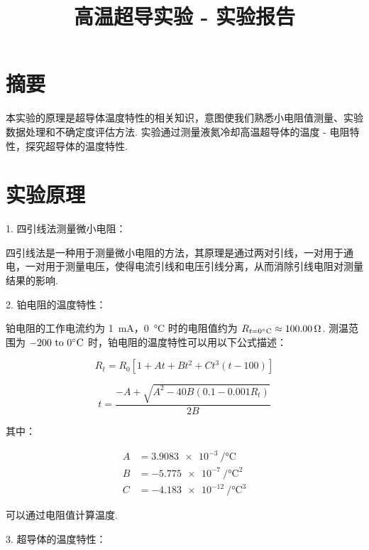 \documentclass{THUexprep}
\begin{document}
\title{高温超导实验 - 实验报告}
\maketitle

\section{摘要}

本实验的原理是超导体温度特性的相关知识，意图使我们熟悉小电阻值测量、实验数据处理和不确定度评估方法. 实验通过测量液氮冷却高温超导体的温度 - 电阻特性，探究超导体的温度特性.

\section{实验原理}

1. 四引线法测量微小电阻：

四引线法是一种用于测量微小电阻的方法，其原理是通过两对引线，一对用于通电，一对用于测量电压，使得电流引线和电压引线分离，从而消除引线电阻对测量结果的影响.

2. 铂电阻的温度特性：

铂电阻的工作电流约为 \SI{1}{\milli\ampere}，\SI{0}{\celsius} 时的电阻值约为 $R_{t=0\celsius}\approx\SI{100.00}{\ohm}$. 测温范围为 $\numrange{-200}{0}\celsius$ 时，铂电阻的温度特性可以用以下公式描述：

\begin{equation}
    R_t = R_0 \left[1 + A t + B t^2 + C t^3(t-100)\right]
\end{equation}

\begin{equation}
    t=\frac{-A+\sqrt{A^2-40B(0.1-0.001R_t)}}{2B}
\end{equation}

其中：

\begin{equation}
    \begin{aligned}
        A &= \SI{3.9083e-3}{\per\celsius}\\
        B &= \SI{-5.775e-7}{\per\celsius\squared}\\
        C &= \SI{-4.183e-12}{\per\celsius\cubed}
    \end{aligned}
\end{equation}

可以通过电阻值计算温度.

3. 超导体的温度特性：
\end{document}

